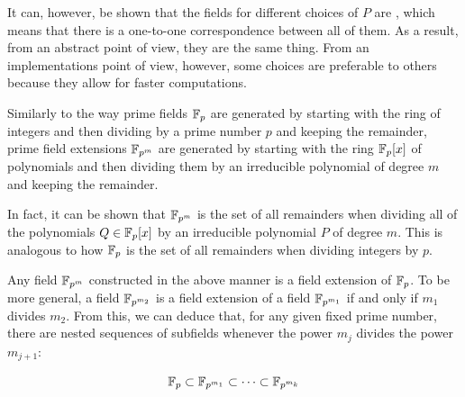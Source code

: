 It can, however, be shown that the fields for different choices of $P$ are , which means that there is a one-to-one correspondence between all of them. As a result, from an abstract point of view, they are the same thing. From an implementations point of view, however, some choices are preferable to others because they allow for faster computations.

\begin{remark}
Similarly to the way prime fields $\mathbb{F}_p$ are generated by starting with the ring of integers and then dividing by a prime number $p$ and keeping the remainder, prime field extensions $\mathbb{F}_{p^m}$ are generated by starting with the ring $\mathbb{F}_p[x]$ of polynomials and then dividing them by an irreducible polynomial of degree $m$ and keeping the remainder.

In fact, it can be shown that $\mathbb{F}_{p^m}$ is the set of all remainders when dividing all of the polynomials $Q\in \mathbb{F}_p[x]$ by an irreducible polynomial $P$ of degree $m$. This is analogous to how $\mathbb{F}_p$ is the set of all remainders when dividing integers by $p$.
\end{remark}

Any field $\mathbb{F}_{p^m}$ constructed in the above manner is a field extension of $\mathbb{F}_p$. To be more general, a field $\mathbb{F}_{p^{m_2}}$ is a field extension of a field $\mathbb{F}_{p^{m_1}}$ if and only if $m_1$ divides $m_2$. From this, we can deduce that, for any given fixed prime number, there are nested sequences of subfields whenever the power $m_j$ divides the power $m_{j+1}$:

\begin{equation}
\mathbb{F}_p \subset \mathbb{F}_{p^{m_1}} \subset \cdots \subset \mathbb{F}_{p^{m_k}}
\end{equation}

